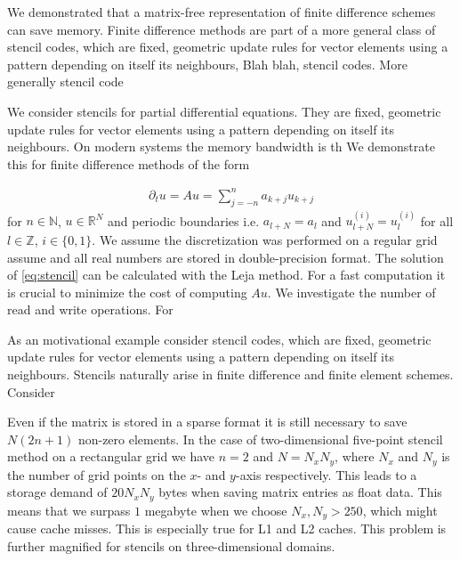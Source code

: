 \documentclass{scrartcl}
\begin{document}
	We demonstrated that a matrix-free representation of finite difference schemes can save memory. Finite difference methods are part of a more general class of  stencil codes, which are fixed, geometric update rules for vector elements using a pattern depending on itself its neighbours, 
	Blah blah, stencil codes. More generally stencil code 
	
	We consider stencils for partial differential equations. They are fixed, geometric update rules for vector elements using a pattern depending on itself its neighbours. On modern systems the memory bandwidth is th 
	We demonstrate this for finite difference methods of the form

\begin{align}
\partial_{t}u = Au = \sum_{j=-n}^{n} a_{k+j}u_{k+j} \label{eq:stencil}
\end{align}
for $n\in\mathbb{N}$, $u\in\mathbb{R}^N$ and periodic boundaries i.e. $a_{l+N} = a_{l}$ and $u^{(i)}_{l+N}=u^{(i)}_{l}$ for all $l\in\mathbb{Z}$, $i\in\{0,1\}$.
We assume the discretization was performed on a regular grid assume and all real numbers are stored in double-precision format.
The solution of \eqref{eq:stencil} can be calculated with the Leja method. For a fast computation it is crucial to minimize the cost of computing $Au$.    
We investigate the number of read and write operations. For 

As an motivational example consider stencil codes, which are fixed, geometric update rules for vector elements using a pattern depending on itself its neighbours. Stencils naturally arise in finite difference and finite element schemes. \\ 
Consider 

Even if the matrix is stored in a sparse format it is still necessary to save $N(2n+1)$ non-zero elements. In the case of two-dimensional five-point stencil method on a rectangular grid we have $n=2$ and $N=N_{x}N_{y}$, where $N_{x}$ and $N_{y}$ is the number of grid points on the $x$- and $y$-axis respectively. This leads to a storage demand of $20N_xN_y$ bytes when saving matrix entries as float data. This means that we surpass $1$ megabyte when we choose $N_x,N_y > 250$, which might cause cache misses. This is especially true for L1 and L2 caches. This problem is further magnified for stencils on three-dimensional domains. \\	
\end{document}
